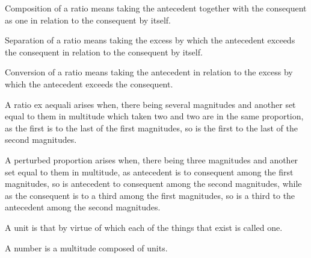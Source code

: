 \begin{scope}
\label{def:V.14}
Composition of a ratio means taking the antecedent together with the
consequent as one in relation to the consequent by itself.
\end{scope}

\begin{scope}
\label{def:V.15}
Separation of a ratio means taking the excess by which the antecedent
exceeds the consequent in relation to the consequent by itself.
\end{scope}

\begin{scope}
\label{def:V.16}
Conversion of a ratio means taking the antecedent in relation to the
excess by which the antecedent exceeds the consequent.
\end{scope}

\begin{scope}
\label{def:V.17}
A ratio ex aequali arises when, there being several magnitudes and
another set equal to them in multitude which taken two and two are
in the same proportion, as the first is to the last of the first
magnitudes, so is the first to the last of the second magnitudes.
\end{scope}

\begin{scope}
\label{def:V.18}
A perturbed proportion arises when, there being three magnitudes and
another set equal to them in multitude, as antecedent is to consequent
among the first magnitudes, so is antecedent to consequent among the
second magnitudes, while as the consequent is to a third among the
first magnitudes, so is a third to the antecedent among the second
magnitudes.
\end{scope}


\begin{scope}
\label{def:VII.1}
A unit is that by virtue of which each of the things that exist is
called one.
\end{scope}

\begin{scope}
\label{def:VII.2}
A number is a multitude composed of units.
\end{scope}

